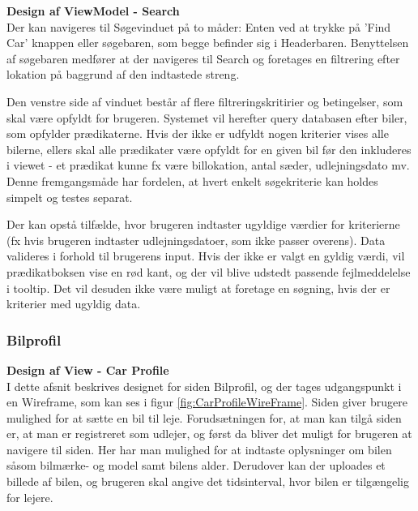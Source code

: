 \documentclass[Rapport/Rapport_main.tex]{subfiles}
\begin{document}
\textbf{Design af ViewModel - Search}\\
Der kan navigeres til Søgevinduet på to måder: Enten ved at trykke på 'Find Car' knappen eller søgebaren, som begge befinder sig i Headerbaren. Benyttelsen af søgebaren medfører at der navigeres til Search og foretages en filtrering efter lokation på baggrund af den indtastede streng. 

Den venstre side af vinduet består af flere filtreringskritirier og betingelser, som skal være opfyldt for brugeren. Systemet vil herefter query databasen efter biler, som opfylder prædikaterne. Hvis der ikke er udfyldt nogen kriterier vises alle bilerne, ellers skal alle prædikater være opfyldt for en given bil før den inkluderes i viewet - et prædikat kunne fx være billokation, antal sæder, udlejningsdato mv. Denne fremgangsmåde har fordelen, at hvert enkelt søgekriterie kan holdes simpelt og testes separat.

Der kan opstå tilfælde, hvor brugeren indtaster ugyldige værdier for kriterierne (fx hvis brugeren indtaster udlejningsdatoer, som ikke passer overens). Data valideres i forhold til brugerens input. Hvis der ikke er valgt en gyldig værdi, vil prædikatboksen vise en rød kant, og der vil blive udstedt passende fejlmeddelelse i tooltip. Det vil desuden ikke være muligt at foretage en søgning, hvis der er kriterier med ugyldig data. 


\subsubsection{Bilprofil}

\textbf{Design af View - Car Profile}
\\I dette afsnit beskrives designet for siden Bilprofil, og der tages udgangspunkt i en Wireframe, som kan ses i figur \ref{fig:CarProfileWireFrame}. Siden giver brugere mulighed for at sætte en bil til leje. Forudsætningen for, at man kan tilgå siden er, at man er registreret som udlejer, og først da bliver det muligt for brugeren at navigere til siden. Her har man mulighed for at indtaste oplysninger om bilen såsom bilmærke- og model samt bilens alder. Derudover kan der uploades et billede af bilen, og brugeren skal angive det tidsinterval, hvor bilen er tilgængelig for lejere.
\end{document}

